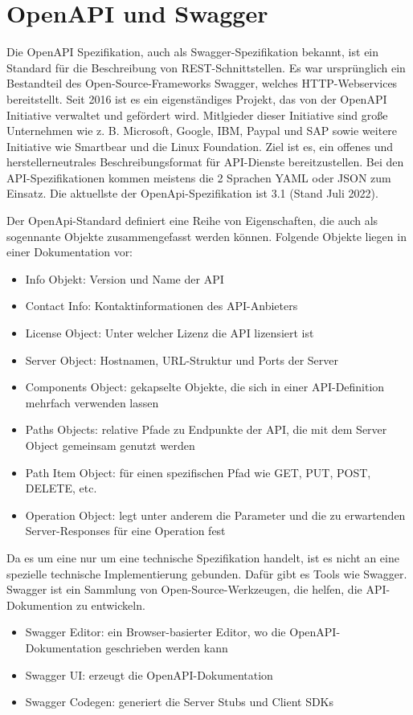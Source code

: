 \newpage
\section{OpenAPI und Swagger}
\cite{OpenAPISwaggerOfficial}
\cite{OpenAPISwaggerWikipedia}
\cite{OpenAPISwaggerIONOS}

Die OpenAPI Spezifikation, auch als Swagger-Spezifikation bekannt, ist ein Standard für die Beschreibung von 
REST-Schnittstellen. Es war ursprünglich ein Bestandteil des Open-Source-Frameworks Swagger, welches HTTP-Webservices bereitstellt.
Seit 2016 ist es ein eigenständiges Projekt, das von der OpenAPI Initiative verwaltet und gefördert wird. 
Mitlgieder dieser Initiative sind große Unternehmen wie z. B. Microsoft, Google, IBM, Paypal und SAP sowie weitere Initiative wie Smartbear und die Linux Foundation.
Ziel ist es, ein offenes und herstellerneutrales Beschreibungsformat für API-Dienste bereitzustellen. Bei den API-Spezifikationen kommen meistens die 2 Sprachen YAML oder JSON zum Einsatz. 
Die aktuellste der OpenApi-Spezifikation ist 3.1 (Stand Juli 2022). 

Der OpenApi-Standard definiert eine Reihe von Eigenschaften, die auch als sogennante Objekte zusammengefasst werden können. 
Folgende Objekte liegen in einer Dokumentation vor:
\begin{itemize}
    \item Info Objekt: Version und Name der API
    \item Contact Info: Kontaktinformationen des API-Anbieters
    \item License Object: Unter welcher Lizenz die API lizensiert ist
    \item Server Object: Hostnamen, URL-Struktur und Ports der Server
    \item Components Object: gekapselte Objekte, die sich in einer API-Definition mehrfach verwenden lassen
    \item Paths Objects: relative Pfade zu Endpunkte der API, die mit dem Server Object gemeinsam genutzt werden
    \item Path Item Object: für einen spezifischen Pfad wie GET, PUT, POST, DELETE, etc.
    \item Operation Object: legt unter anderem die Parameter und die zu erwartenden Server-Responses für eine Operation fest
\end{itemize}

Da es um eine nur um eine technische Spezifikation handelt, ist es nicht an eine spezielle technische Implementierung gebunden. Dafür gibt es Tools wie Swagger. 
Swagger ist ein Sammlung von Open-Source-Werkzeugen, die helfen, die API-Dokumention zu entwickeln. 
\begin{itemize}
    \item Swagger Editor: ein Browser-basierter Editor, wo die OpenAPI-Dokumentation geschrieben werden kann
    \item Swagger UI: erzeugt die OpenAPI-Dokumentation
    \item Swagger Codegen: generiert die Server Stubs und Client SDKs
\end{itemize}

